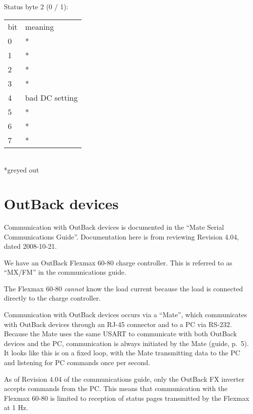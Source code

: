 \documentclass[pdftex,oneside,12pt,a4paper]{book}
\begin{document}
Status byte 2 (0 / 1):\\
\begin{tabular}{ll}
bit & meaning\\
0 & * \\
1 & * \\
2 & * \\
3 & * \\
4 & bad DC setting \\
5 & * \\
6 & * \\
7 & * 
\end{tabular}\\
{*}greyed out

\section{OutBack devices}
Communication with OutBack devices is documented in the ``Mate Serial Communications Guide''. Documentation here is from reviewing Revision 4.04, dated 2008-10-21.

We have an OutBack Flexmax 60-80 charge controller.  This is referred to as ``MX/FM'' in the communications guide.

The Flexmax 60-80 \emph{cannot} know the load current because the load is connected directly to the charge controller.


Communication with OutBack devices occurs via a ``Mate'', which communicates with OutBack devices through an RJ-45 connector and to a PC via RS-232.  Because the Mate uses the same USART to communicate with both OutBack devices and the PC, communication is always initiated by the Mate (guide, p.\ 5). It looks like this is on a fixed loop, with the Mate transmitting data to the PC and listening for PC commands once per second.

As of Revision 4.04 of the communications guide, only the OutBack FX inverter accepts commands from the PC.  This means that communication with the Flexmax 60-80 is limited to reception of status pages transmitted by the Flexmax at 1 Hz.
\end{document}
